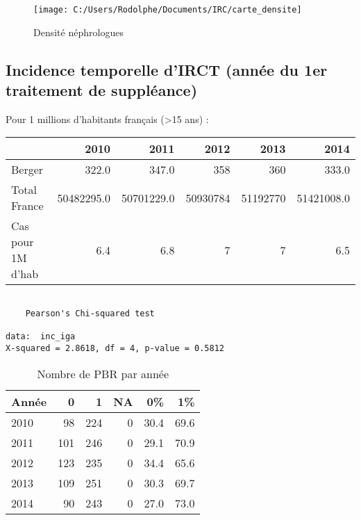 \documentclass[11pt,a4paper]{article}\usepackage[]{graphicx}\usepackage[]{color}
\makeatletter
\newenvironment{kframe}{%
 \def\at@end@of@kframe{}%
 \ifinner\ifhmode%
  \def\at@end@of@kframe{\end{minipage}}%
  \begin{minipage}{\columnwidth}%
 \fi\fi%
 \def\FrameCommand##1{\hskip\@totalleftmargin \hskip-\fboxsep
 \colorbox{shadecolor}{##1}\hskip-\fboxsep
     \hskip-\linewidth \hskip-\@totalleftmargin \hskip\columnwidth}%
 \MakeFramed {\advance\hsize-\width
   \@totalleftmargin\z@ \linewidth\hsize
   \@setminipage}}%
 {\par\unskip\endMakeFramed%
 \at@end@of@kframe}
\newenvironment{knitrout}{}{} %
\makeatother
\begin{document}
\begin{figure}[H]
	\centering
	\texttt{[image: C:/Users/Rodolphe/Documents/IRC/carte\_densite]}
	\caption{Densité néphrologues}
	\label{fig:cartedensite}
\end{figure}

  \subsection{Incidence temporelle d'IRCT (année du 1er traitement de suppléance)}

Pour 1 millions d'habitants français (\textgreater 15 ans) :

\begin{table}[H]
\centering
\begin{tabular}{lrrrrr}
  \hline
 & 2010 & 2011 & 2012 & 2013 & 2014 \\ 
  \hline
Berger & 322.0 & 347.0 & 358 & 360 & 333.0 \\ 
  Total France & 50482295.0 & 50701229.0 & 50930784 & 51192770 & 51421008.0 \\ 
  Cas pour 1M d'hab & 6.4 & 6.8 & 7 & 7 & 6.5 \\ 
   \hline
\end{tabular}
\end{table}


\begin{knitrout}
\color{fgcolor}\begin{kframe}
\begin{verbatim}

	Pearson's Chi-squared test

data:  inc_iga
X-squared = 2.8618, df = 4, p-value = 0.5812
\end{verbatim}
\end{kframe}
\end{knitrout}

\begin{table}[H]
\centering
\begin{tabular}{lrrrrr}
  \hline
Année & 0 & 1 & NA & 0\% & 1\% \\ 
  \hline
2010 & 98 & 224 & 0 & 30.4 & 69.6 \\ 
  2011 & 101 & 246 & 0 & 29.1 & 70.9 \\ 
  2012 & 123 & 235 & 0 & 34.4 & 65.6 \\ 
  2013 & 109 & 251 & 0 & 30.3 & 69.7 \\ 
  2014 & 90 & 243 & 0 & 27.0 & 73.0 \\ 
   \hline
\end{tabular}
\caption{Nombre de PBR par année} 
\end{table}
\end{document}
